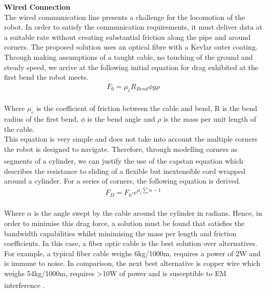 \documentclass[11pt]{article}		%
\newcommand{\supercite}[1]{\textsuperscript{\cite{#1}}}		%
\begin{document}
            \textbf{Wired Connection}
	        \\
	        The wired communication line presents a challenge for the locomotion of the robot. 
	        In order to satisfy the communication requirements, it must deliver data at a suitable rate without creating substantial friction along the pipe and around corners. 
	        The proposed solution uses an optical fibre with a Kevlar outer coating. 
	        Through making assumptions of a taught cable, no touching of the ground and steady speed, we arrive at the following initial equation for drag exhibited at the first bend the robot meets. 
	        \begin{align}
					F_0 = \mu_c R_{Bend} \phi g \rho
			\end{align}
	        \\
            \hspace*{3ex}Where $\mu_c$ is the coefficient of friction between the cable and bend, R is the bend radius of the first bend, $\phi$ is the bend angle and $\rho$ is the mass per unit length of the cable.
	        \\
            \hspace*{3ex}This equation is very simple and does not take into account the multiple corners the robot is designed to navigate.
	        Therefore, through modelling corners as segments of a cylinder, we can justify the use of the capstan equation \supercite{capstan} which describes the resistance to sliding of a flexible but inextensible cord wrapped around a cylinder. 
	        For a series of corners, the following equation is derived.
	        \begin{align}
	                F_D = F_0 \boldsymbol{\cdot} {e}^{\mu_c \sum \alpha -1} \label{cableDrag}
	        \end{align}
	        \\
            \hspace*{3ex}Where $\alpha$ is the angle swept by the cable around the cylinder in radians. 
		    Hence, in order to minimise this drag force, a solution must be found that satisfies the bandwidth capabilities whilst minimising the mass per length and friction coefficients.  
		    In this case, a fiber optic cable is the best solution over alternatives. 
		    For example, a typical fiber cable weighs 6kg/1000m, requires a power of 2W and is immune to noise. 
		    In comparison, the next best alternative is copper wire which weighs 54kg/1000m, requires >10W of power and is susceptible to EM interference \supercite{wiring}.
\end{document}
